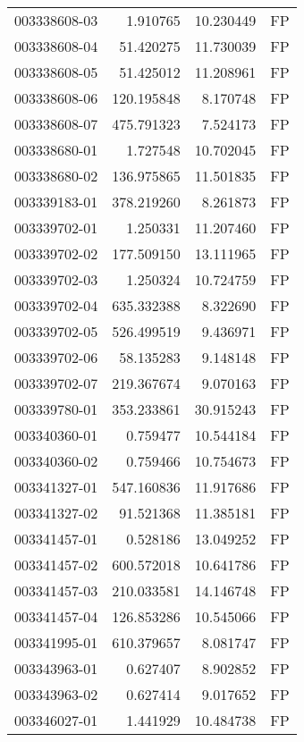 \begin{tabular}{lrrl}
003338608-03 &    1.910765 &      10.230449 &   FP \\
003338608-04 &   51.420275 &      11.730039 &   FP \\
003338608-05 &   51.425012 &      11.208961 &   FP \\
003338608-06 &  120.195848 &       8.170748 &   FP \\
003338608-07 &  475.791323 &       7.524173 &   FP \\
003338680-01 &    1.727548 &      10.702045 &   FP \\
003338680-02 &  136.975865 &      11.501835 &   FP \\
003339183-01 &  378.219260 &       8.261873 &   FP \\
003339702-01 &    1.250331 &      11.207460 &   FP \\
003339702-02 &  177.509150 &      13.111965 &   FP \\
003339702-03 &    1.250324 &      10.724759 &   FP \\
003339702-04 &  635.332388 &       8.322690 &   FP \\
003339702-05 &  526.499519 &       9.436971 &   FP \\
003339702-06 &   58.135283 &       9.148148 &   FP \\
003339702-07 &  219.367674 &       9.070163 &   FP \\
003339780-01 &  353.233861 &      30.915243 &   FP \\
003340360-01 &    0.759477 &      10.544184 &   FP \\
003340360-02 &    0.759466 &      10.754673 &   FP \\
003341327-01 &  547.160836 &      11.917686 &   FP \\
003341327-02 &   91.521368 &      11.385181 &   FP \\
003341457-01 &    0.528186 &      13.049252 &   FP \\
003341457-02 &  600.572018 &      10.641786 &   FP \\
003341457-03 &  210.033581 &      14.146748 &   FP \\
003341457-04 &  126.853286 &      10.545066 &   FP \\
003341995-01 &  610.379657 &       8.081747 &   FP \\
003343963-01 &    0.627407 &       8.902852 &   FP \\
003343963-02 &    0.627414 &       9.017652 &   FP \\
003346027-01 &    1.441929 &      10.484738 &   FP \\

\end{tabular}
